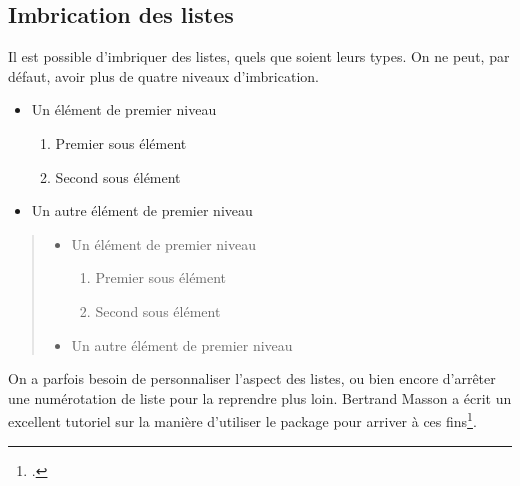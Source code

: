 \subsection{Imbrication des listes}

Il est possible d'imbriquer des listes, quels que soient leurs types. On ne peut, par défaut, avoir plus de quatre niveaux d'imbrication.

\begin{latexcode}
\begin{itemize}
    \item Un élément de premier niveau
    \begin{enumerate}
            \item Premier sous élément
            \item Second sous élément
    \end{enumerate}
    \item Un autre élément de premier niveau
\end{itemize}
\end{latexcode}

\begin{quotation}
\noindent\begin{itemize}
    \item Un élément de premier niveau
    \begin{enumerate}
            \item Premier sous élément
            \item Second sous élément
    \end{enumerate}
    \item Un autre élément de premier niveau
\end{itemize}
\end{quotation}

\begin{plusloins}
On a parfois besoin de personnaliser l'aspect des listes, ou bien encore d'arrêter une numérotation de liste pour la reprendre plus loin. Bertrand Masson a écrit un excellent tutoriel sur la manière d'utiliser le package  pour arriver à ces fins\footcite{bebert_liste}. 
\end{plusloins}
